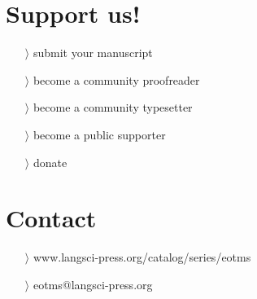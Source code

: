 \documentclass[
notumble,
nofoldmark,
]{leaflet}
\begin{document}
{{    \section{\color{LIGHTGRAY} \sffamily \Large Support us!}
	\begin{itemize}
	  \item[$\rangle$] submit your manuscript 
	  \item[$\rangle$] become a community proofreader 
	  \item[$\rangle$] become a community typesetter
	  \item[$\rangle$] become a public supporter
	  \item[$\rangle$] donate
	\end{itemize} 
    \section{\color{LIGHTGRAY} \sffamily \Large Contact} 
	\begin{itemize}
	  \item[$\rangle$] \sffamily www.langsci-press.org/catalog/series/eotms
	  \item[$\rangle$]\sffamily  eotms@langsci-press.org 
	\end{itemize} 
  }
}

\usebox{\pageone}

\newpage

\usebox{\pagetwo}

\newpage

\usebox{\pagetwo}

\newpage

\usebox{\pagetwo}

\newpage

\usebox{\pageone}

\newpage

\usebox{\pageone}
 

\loggingall
\end{document}
